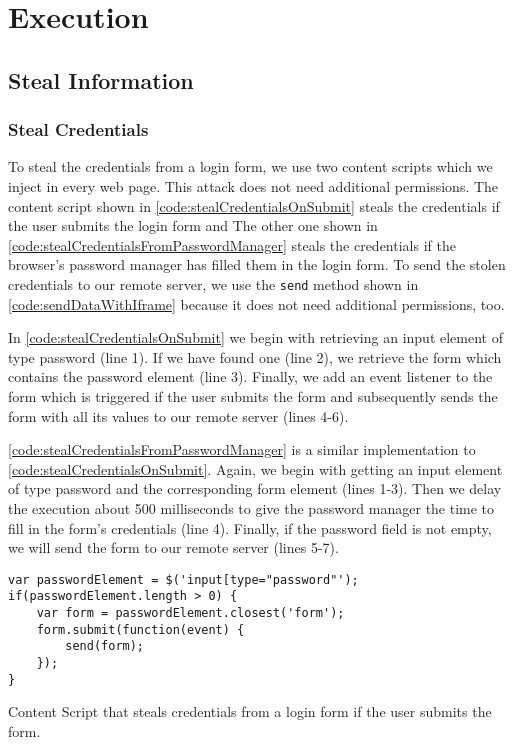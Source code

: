 	


\clearpage
\section{Execution}
\label{sec:execution}
	

\subsection{Steal Information}


\subsubsection{Steal Credentials}
	
	To steal the credentials from a login form, we use two content scripts which we inject in every web page. This attack does not need additional permissions. The content script shown in \autoref{code:stealCredentialsOnSubmit} steals the credentials if the user submits the login form and The other one shown in \autoref{code:stealCredentialsFromPasswordManager} steals the credentials if the browser's password manager has filled them in the login form. To send the stolen credentials to our remote server, we use the \texttt{send} method shown in \autoref{code:sendDataWithIframe} because it does not need additional permissions, too. 
	
	In \autoref{code:stealCredentialsOnSubmit} we begin with retrieving an input element of type password (line 1). If we have found one (line 2), we retrieve the form which contains the password element (line 3). Finally, we add an event listener to the form which is triggered if the user submits the form and subsequently sends the form with all its values to our remote server (lines 4-6). 
	
	\autoref{code:stealCredentialsFromPasswordManager} is a similar implementation to \autoref{code:stealCredentialsOnSubmit}. Again, we begin with getting an input element of type password and the corresponding form element (lines 1-3). Then we delay the execution about 500 milliseconds to give the password manager the time to fill in the form's credentials (line 4). Finally, if the password field is not empty, we will send the form to our remote server (lines 5-7).
	
	\begin{code}
		\begin{lstlisting}	
var passwordElement = $('input[type="password"');
if(passwordElement.length > 0) {
	var form = passwordElement.closest('form');
	form.submit(function(event) {
		send(form);
	});
}
\end{lstlisting}
		\caption{Content Script that steals credentials from a login form if the user submits the form.}
		\label{code:stealCredentialsOnSubmit}
	\end{code}
	
